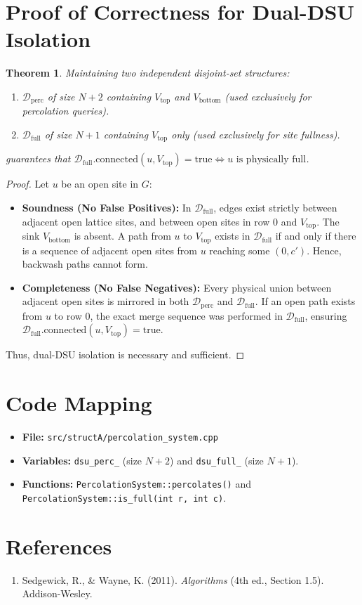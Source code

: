 \documentclass[11pt,a4paper]{article}
\newtheorem{theorem}{Theorem}
\begin{document}
\section{Proof of Correctness for Dual-DSU Isolation}
\begin{theorem}
Maintaining two independent disjoint-set structures:
\begin{enumerate}
    \item $\mathcal{D}_{\text{perc}}$ of size $N + 2$ containing $V_{\text{top}}$ and $V_{\text{bottom}}$ (used exclusively for percolation queries).
    \item $\mathcal{D}_{\text{full}}$ of size $N + 1$ containing $V_{\text{top}}$ only (used exclusively for site fullness).
\end{enumerate}
guarantees that $\mathcal{D}_{\text{full}}.\text{connected}(u, V_{\text{top}}) = \text{true} \iff u \text{ is physically full}$.
\end{theorem}
\begin{proof}
Let $u$ be an open site in $G$:
\begin{itemize}
    \item \textbf{Soundness (No False Positives):} In $\mathcal{D}_{\text{full}}$, edges exist strictly between adjacent open lattice sites, and between open sites in row $0$ and $V_{\text{top}}$. The sink $V_{\text{bottom}}$ is absent. A path from $u$ to $V_{\text{top}}$ exists in $\mathcal{D}_{\text{full}}$ if and only if there is a sequence of adjacent open sites from $u$ reaching some $(0, c')$. Hence, backwash paths cannot form.
    \item \textbf{Completeness (No False Negatives):} Every physical union between adjacent open sites is mirrored in both $\mathcal{D}_{\text{perc}}$ and $\mathcal{D}_{\text{full}}$. If an open path exists from $u$ to row $0$, the exact merge sequence was performed in $\mathcal{D}_{\text{full}}$, ensuring $\mathcal{D}_{\text{full}}.\text{connected}(u, V_{\text{top}}) = \text{true}$.
\end{itemize}
Thus, dual-DSU isolation is necessary and sufficient.
\end{proof}

\section{Code Mapping}
\begin{itemize}
    \item \textbf{File:} \texttt{src/structA/percolation\_system.cpp}
    \item \textbf{Variables:} \texttt{dsu\_perc\_} (size $N+2$) and \texttt{dsu\_full\_} (size $N+1$).
    \item \textbf{Functions:} \texttt{PercolationSystem::percolates()} and \texttt{PercolationSystem::is\_full(int r, int c)}.
\end{itemize}

\section{References}
\begin{enumerate}
    \item Sedgewick, R., \& Wayne, K. (2011). \textit{Algorithms} (4th ed., Section 1.5). Addison-Wesley.
\end{enumerate}
\end{document}
